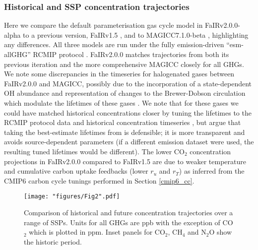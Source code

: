 \documentclass[gmd, manuscript]{copernicus}
\begin{document}
\subsubsection{Historical and SSP concentration trajectories}
Here we compare the default parameterisation gas cycle model in FaIRv2.0.0-alpha to a previous version, FaIRv1.5 \citep{Smith2018}, and to MAGICC7.1.0-beta \citep{Meinshausen2019}, highlighting any differences. All three models are run under the fully emission-driven ``esm-allGHG'' RCMIP protocol \citep{Nicholls2019}. FaIRv2.0.0 matches trajectories from both its previous iteration and the more comprehensive MAGICC closely for all GHGs. We note some discrepancies in the timeseries for halogenated gases between FaIRv2.0.0 and MAGICC, possibly due to the incorporation of a state-dependent OH abundance and representation of changes to the Brewer-Dobson circulation which modulate the lifetimes of these gases \citep{Meinshausen2011}. We note that for these gases we could have matched historical concentrations closer by tuning the lifetimes to the RCMIP protocol data and historical concentration timeseries \citep{Nicholls2019,Meinshausen2017}, but argue that taking the best-estimate lifetimes from \cite{WMOAppA} is defensible; it is more transparent and avoids source-dependent parameters (if a different emission dataset were used, the resulting tuned lifetimes would be different). The lower CO$_2$ concentration projections in FaIRv2.0.0 compared to FaIRv1.5 are due to weaker temperature and cumulative carbon uptake feedbacks (lower $r_u$ and $r_T$) as inferred from the CMIP6 carbon cycle tunings performed in Section \ref{cmip6_cc}. 
\clearpage
\begin{figure}[t]
    \texttt{[image: "figures/Fig2".pdf]}
    \caption{Comparison of historical and future concentration trajectories over a range of SSPs. Units for all GHGs are ppb with the exception of CO$_2$ which is plotted in ppm. Inset panels for CO$_2$, CH$_4$ and N$_2$O show the historic period.}
    \label{fig:conc_trajectories}
\end{figure}
\clearpage
\end{document}
